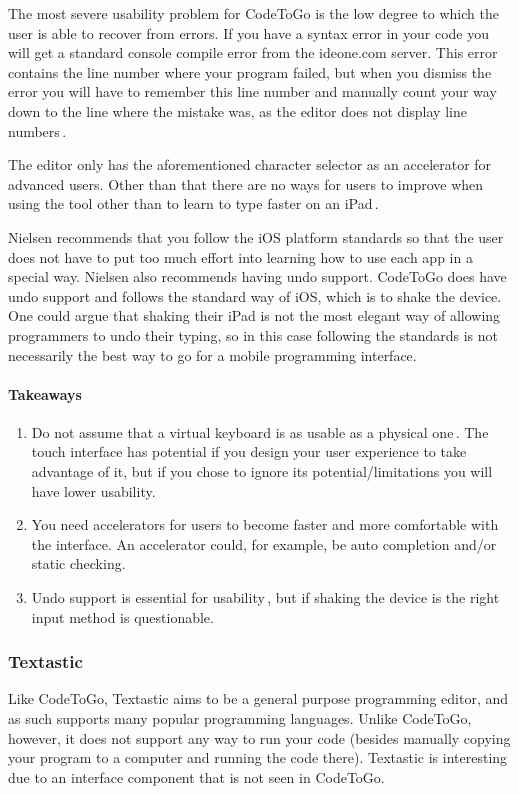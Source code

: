 The most severe usability problem for CodeToGo is the low degree to which the user is able to recover from errors. If you have a syntax error in your code you will get a standard console compile error from the ideone.com server. This error contains the line number where your program failed, but when you dismiss the error you will have to remember this line number and manually count your way down to the line where the mistake was, as the editor does not display line numbers\,\cite{nielsen1990heuristic}.

The editor only has the aforementioned character selector as an accelerator for advanced users. Other than that there are no ways for users to improve when using the tool other than to learn to type faster on an iPad\,\cite{nielsen1990heuristic}.

Nielsen  recommends that you follow the iOS platform standards so that the user does not have to put too much effort into learning how to use each app in a special way. Nielsen also recommends having undo support. CodeToGo does have undo support and follows the standard way of iOS, which is to shake the device. One could argue that shaking their iPad is not the most elegant way of allowing programmers to undo their typing, so in this case following the standards is not necessarily the best way to go for a mobile programming interface.

\paragraph{Takeaways}
\begin{enumerate}
	\item Do not assume that a virtual keyboard is as usable as a physical one\,\cite{nielsen2013mobile}. The touch interface has potential if you design your user experience to take advantage of it, but if you chose to ignore its potential/limitations you will have lower usability.
	\item You need accelerators for users to become faster and more comfortable with the interface. An accelerator could, for example, be auto completion and/or static checking.
	\item Undo support is essential for usability\,\cite{nielsen1990heuristic}, but if shaking the device is the right input method is questionable.
\end{enumerate}


\subsubsection{Textastic}
\label{subsub:Textastic}
Like CodeToGo, Textastic aims to be a general purpose programming editor, and as such supports many popular programming languages. Unlike CodeToGo, however, it does not support any way to run your code (besides manually copying your program to a computer and running the code there). Textastic is interesting due to an interface component that is not seen in CodeToGo.

